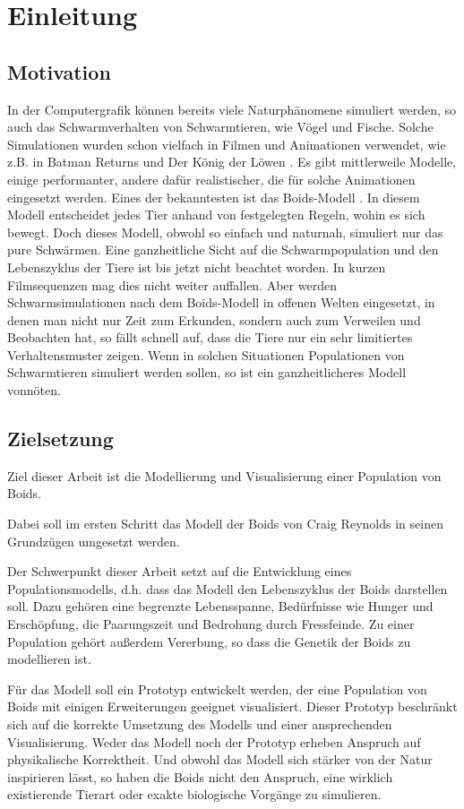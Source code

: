 \documentclass[draft=false
              ,paper=a4
              ,twoside=false
              ,fontsize=11pt
              ,headsepline
              ,BCOR10mm
              ,DIV11
              ,bibtotoc
              ,liststotoc
              ]{scrbook}
\begin{document}
\chapter{Einleitung}\label{einleitung}
\section{Motivation}
In der Computergrafik können bereits viele Naturphänomene simuliert werden, so auch das Schwarmverhalten von Schwarmtieren, wie Vögel und Fische.
Solche Simulationen wurden schon vielfach in Filmen und Animationen verwendet, wie z.B. in Batman Returns und Der König der Löwen \cite{movies}. Es gibt mittlerweile Modelle, einige performanter, andere dafür realistischer, die für solche Animationen eingesetzt werden. Eines der bekanntesten ist das Boids-Modell \cite{reynolds87}. In diesem Modell entscheidet jedes Tier anhand von festgelegten Regeln, wohin es sich bewegt. Doch dieses Modell, obwohl so einfach und naturnah, simuliert nur das pure Schwärmen. Eine ganzheitliche Sicht auf die Schwarmpopulation und den Lebenszyklus der Tiere ist bis jetzt nicht beachtet worden. In kurzen Filmsequenzen mag dies nicht weiter auffallen. Aber werden Schwarmsimulationen nach dem Boids-Modell in offenen Welten eingesetzt, in denen man nicht nur Zeit zum Erkunden, sondern auch zum Verweilen und Beobachten hat, so fällt schnell auf, dass die Tiere nur ein sehr limitiertes Verhaltensmuster zeigen.
Wenn in solchen Situationen Populationen von Schwarmtieren simuliert werden sollen, so ist ein ganzheitlicheres Modell vonnöten.

\section{Zielsetzung}
Ziel dieser Arbeit ist die Modellierung und Visualisierung einer Population von Boids.

Dabei soll im ersten Schritt das Modell der Boids von Craig Reynolds \cite{reynolds87} in seinen Grundzügen umgesetzt werden.

Der Schwerpunkt dieser Arbeit setzt auf die Entwicklung eines Populationsmodells, d.h. dass das Modell den Lebenszyklus der Boids darstellen soll. Dazu gehören eine begrenzte Lebensspanne, Bedürfnisse wie Hunger und Erschöpfung, die Paarungszeit und Bedrohung durch Fressfeinde.
Zu einer Population gehört außerdem Vererbung, so dass die Genetik der Boids zu modellieren ist.

Für das Modell soll ein Prototyp entwickelt werden, der eine Population von Boids mit einigen Erweiterungen geeignet visualisiert.
Dieser Prototyp beschränkt sich auf die korrekte Umsetzung des Modells und einer ansprechenden Visualisierung. Weder das Modell noch der Prototyp erheben Anspruch auf physikalische Korrektheit. Und obwohl das Modell sich stärker von der Natur inspirieren lässt, so haben die Boids nicht den Anspruch, eine wirklich existierende Tierart oder exakte biologische Vorgänge zu simulieren.
\end{document}

